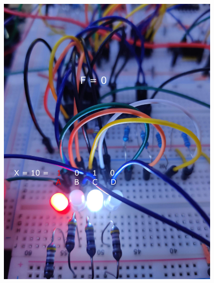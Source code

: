 \documentclass{article}
\begin{document}
\begin{figure}[ht!]
    \centering
    \includegraphics[width=\textwidth]{X_10_1010.jpg}
\end{figure}

\pagebreak
\end{document}
